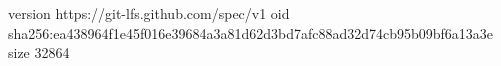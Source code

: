 version https://git-lfs.github.com/spec/v1
oid sha256:ea438964f1e45f016e39684a3a81d62d3bd7afc88ad32d74cb95b09bf6a13a3e
size 32864
